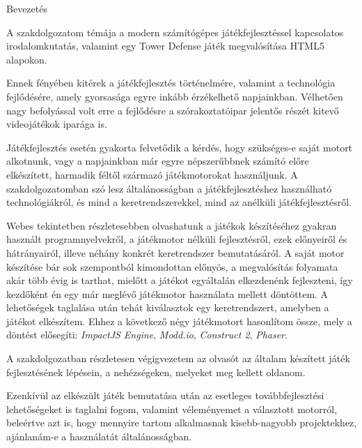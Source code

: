 \begin{MyChapter}{Bevezetés}
	
	A szakdolgozatom témája a modern számítógépes játékfejlesztéssel kapcsolatos irodalomkutatás, valamint egy Tower Defense játék megvalósítása HTML5 alapokon.
	
	Ennek fényében kitérek a játékfejlesztés történelmére, valamint a technológia fejlődésére, amely gyorsasága egyre inkább érzékelhető napjainkban. Vélhetően nagy befolyással volt erre a fejlődésre a szórakoztatóipar jelentős részét kitevő videojátékok iparága is. 
	
	Játékfejlesztés esetén gyakorta felvetődik a kérdés, hogy szükséges-e saját motort alkotnunk, vagy a napjainkban már egyre népszerűbbnek számító előre elkészített, harmadik féltől származó játékmotorokat használjunk. A szakdolgozatomban szó lesz általánosságban a játékfejlesztéshez használható technológiákról, és mind a keretrendszerekkel, mind az anélküli játékfejlesztésről.
	
	Webes tekintetben részletesebben olvashatunk a játékok készítéséhez gyakran használt programnyelvekről, a játékmotor nélküli fejlesztésről, ezek előnyeiről és hátrányairól, illeve néhány konkrét keretrendszer bemutatásáról. A saját motor készítése bár sok szempontból kimondottan előnyös, a megvalósítás folyamata akár több évig is tarthat, mielőtt a játékot egyáltalán elkezdenénk fejleszteni, így kezdőként én egy már meglévő játékmotor használata mellett döntöttem. A lehetőségek taglalása után tehát kiválasztok egy keretrendszert, amelyben a játékot elkészítem. Ehhez a következő négy játékmotort hasonlítom össze, mely a döntést elősegíti: \textit{ImpactJS Engine}, \textit{Modd.io}, \textit{Construct 2}, \textit{Phaser}.
	
	A szakdolgozatban részletesen végigvezetem az olvasót az általam készített játék fejlesztésének lépésein, a nehézségeken, melyeket meg kellett oldanom.

	Ezenkívül az elkészült játék bemutatása után az esetleges továbbfejlesztési lehetőségeket is taglalni fogom, valamint véleményemet a választott motorról, beleértve azt is, hogy mennyire tartom alkalmasnak kisebb-nagyobb projektekhez, ajánlanám-e a használatát általánosságban.
	
\end{MyChapter}